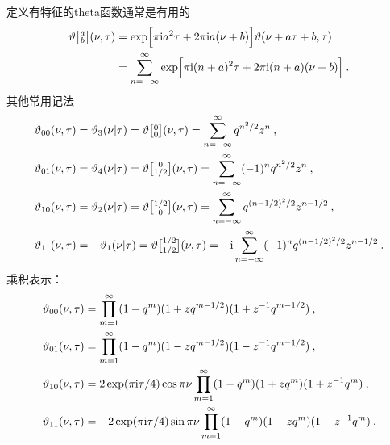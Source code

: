 定义有特征的theta函数通常是有用的
\begin{align}
	\vartheta\bigl[\!\begin{smallmatrix} a\\b\end{smallmatrix}\!\bigr]
	(\nu, \tau) &=\exp \Bigl[\pi \mathrm{i} a^{2} \tau+2 \pi \mathrm{i} a(\nu+b)\Bigr] \vartheta(\nu+a \tau+b, \tau)  \nonumber \\
	&=\sum_{n=-\infty}^{\infty} \exp \Bigl[\pi \mathrm{i}(n+a)^{2} \tau+2 \pi \mathrm{i}(n+a)(\nu+b)\Bigr] \:. \label{7.2.36}
\end{align}
其他常用记法
\begin{subequations} \label{7.2.37}
\begin{align}
\vartheta_{00}(\nu, \tau)&=\vartheta_{3}(\nu \vert \tau)= 
\vartheta\bigl[\!\begin{smallmatrix} 0\\0\end{smallmatrix}\!\bigr](\nu, \tau) = \sum_{n=-\infty}^{\infty} q^{n^{2} / 2} z^{n} \:, 
\label{7.2.37a}  \\
\vartheta_{01}(\nu, \tau) &= \vartheta_{4}(\nu \vert \tau)=
\vartheta\bigl[\!\begin{smallmatrix} 0\\1/2\end{smallmatrix}\!\bigr](\nu, \tau)=
\sum_{n=-\infty}^{\infty}(-1)^{n} q^{n^{2} / 2} z^{n} \:, \label{7.2.37b}\\
\vartheta_{10}(\nu, \tau) &= \vartheta_{2}(\nu \vert \tau) = 
\vartheta\bigl[\!\begin{smallmatrix} 1/2\\0\end{smallmatrix}\!\bigr](\nu, \tau)
=\sum_{n=-\infty}^{\infty} q^{(n-1 / 2)^{2} / 2} z^{n-1 / 2}  \:, \label{7.2.37c} \\
\vartheta_{11}(\nu, \tau)&=-\vartheta_{1}(\nu \vert \tau) = 
\vartheta\bigl[\!\begin{smallmatrix} 1/2\\1/2\end{smallmatrix}\!\bigr](\nu, \tau)
=-\mi \sum_{n=-\infty}^{\infty}(-1)^{n} q^{(n-1 / 2)^{2} / 2} z^{n-1 / 2} \:. \label{7.2.37d}
\end{align}
\end{subequations}
乘积表示：
\begin{subequations} \label{7.2.38}
\begin{align}
\vartheta_{00}(\nu, \tau) &= \prod_{m=1}^{\infty}(1-q^{m})(1+z q^{m-1/2})(1+z^{-1} q^{m-1/2}) \:, \label{7.2.38a} \\ 
\vartheta_{01}(\nu, \tau) &= \prod_{m=1}^{\infty}(1-q^{m})(1-z q^{m-1/2})(1-z^{-1} q^{m-1/2}) \:, \label{7.2.38b} \\
\vartheta_{10}(\nu, \tau) &= 2 \exp (\pi \mathrm{i} \tau / 4) \cos \pi \nu 
 \prod_{m=1}^{\infty}(1-q^{m})(1+z q^{m})(1+z^{-1} q^{m}) \:, \label{7.2.38c} \\
\vartheta_{11}(\nu, \tau) &= -2 \exp (\pi \mathrm{i} \tau / 4) \sin \pi \nu 
\prod_{m=1}^{\infty}(1-q^{m})(1-z q^{m})(1-z^{-1} q^{m})  \:. \label{7.2.38d}
\end{align}	
\end{subequations}
